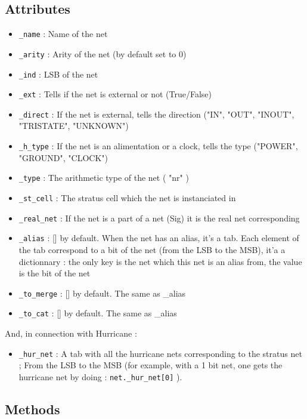 \subsection{Attributes}

\begin{itemize}
    \item \verb-_name- : Name of the net
    \item \verb-_arity- : Arity of the net (by default set to 0)
    \item \verb-_ind- : LSB of the net
    \item \verb-_ext- : Tells if the net is external or not (True/False)
    \item \verb-_direct- : If the net is external, tells the direction ("IN", "OUT", "INOUT", "TRISTATE", "UNKNOWN")
    \item \verb-_h_type- : If the net is an alimentation or a clock, tells the type ("POWER", "GROUND", "CLOCK")
    \item \verb-_type- : The arithmetic type of the net ( "nr" )
    \item \verb-_st_cell- : The stratus cell which the net is instanciated in
    \item \verb-_real_net- : If the net is a part of a net (Sig) it is the real net corresponding
    \item \verb-_alias- : [] by default. When the net has an alias, it's a tab. Each element of the tab correspond to a bit of the net (from the LSB to the MSB), it'a a dictionnary : the only key is the net which this net is an alias from, the value is the bit of the net
    \item \verb-_to_merge- : [] by default. The same as \_alias
    \item \verb-_to_cat- : [] by default. The same as \_alias\\
\end{itemize}

\indent And, in connection with Hurricane :
\begin{itemize}
    \item \verb-_hur_net- : A tab with all the hurricane nets corresponding to the stratus net ; From the LSB to the MSB (for example, with a 1 bit net, one gets the hurricane net by doing : \verb-net._hur_net[0]- ).
\end{itemize}

\subsection{Methods}

